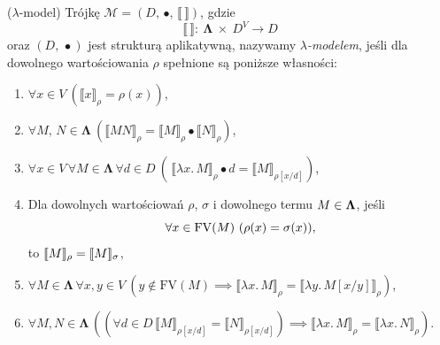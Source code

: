 \begin{definicja}\label{def:lambda-model-1}(\(\lambda\)-model) %
  Trójkę \(\mathcal{M}=(D,\,\bullet,\,\llbracket\,\rrbracket)\), gdzie 
   \[\llbracket\,\rrbracket:\:\mathbf{\Lambda}\ \times\ D^{V}\to D\]
  oraz \((D,\,\bullet)\) jest strukturą aplikatywną,
  nazywamy \emph{\(\lambda\)-modelem}, jeśli dla dowolnego wartościowania \(\rho\) spełnione są poniższe własności:
  \begin{enumerate}[label={(\roman*)}, ref={(\roman*)}]
    \setlength\itemsep{0em}
    \item \(\forall x \in V\ \left(\llbracket x \rrbracket_\rho = \rho(x)\right)\)\label{def:lambda-interpret-1},
    \item \(\forall M,\,N \in \mathbf{\Lambda}\ (\llbracket MN \rrbracket_\rho = \llbracket M\rrbracket_\rho \bullet \llbracket N \rrbracket_\rho)\)\label{def:lambda-interpret-2},
    \item \(\forall x \in V\,\forall M\in \mathbf{\Lambda}\,\forall d\in D\ (\, \llbracket \lambda x.\,M\rrbracket_\rho \bullet d = \llbracket M \rrbracket_{\rho[x/d]})\)\label{def:lambda-interpret-3},
    \item Dla dowolnych wartościowań \(\rho\),  \(\sigma\) i dowolnego termu \(M\in\nobreak\mathbf{\Lambda}\), jeśli \[\forall x\in\nobreak\mathrm{FV}(M)\ (\rho(x) =\nobreak \sigma(x)),\] to \(\llbracket M\rrbracket_\rho =\nobreak\llbracket M \rrbracket_\sigma\)\label{def:lambda-interpret-4},
    \item \(\forall M\in\mathbf{\Lambda}\,\forall x, y\in V\ (y\not\in\mathrm{FV}(M)\implies \llbracket\lambda x.\,M\rrbracket_\rho = \llbracket \lambda y.\,M[x/y]\rrbracket_\rho)\)\label{def:lambda-interpret-5},
    \item \(\forall M,N\in\mathbf{\Lambda}\,\left(\left(\forall d\in D\, \llbracket M \rrbracket_{\rho[x/d]}=\llbracket N \rrbracket_{\rho[x/d]}\right)\implies \llbracket \lambda x.\,M \rrbracket_\rho=\llbracket \lambda x.\,N\rrbracket_\rho\right)\)\label{def:lambda-interpret-6}.
  \end{enumerate}


\end{definicja}
